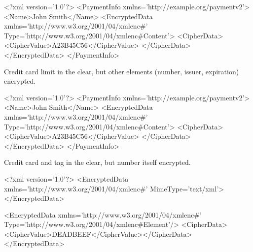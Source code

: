 \documentclass{sepslide-soa-faked} %
\begin{document}
\begin{slide}
\begin{xml}
  <?xml version='1.0'?> 
  <PaymentInfo xmlns='http://example.org/paymentv2'>
    <Name>John Smith</Name>
      <EncryptedData xmlns='http://www.w3.org/2001/04/xmlenc#'
                      Type='http://www.w3.org/2001/04/xmlenc#Content'>
        <CipherData>
          <CipherValue>A23B45C56</CipherValue>
        </CipherData>
      </EncryptedData>
  </PaymentInfo>
\end{xml}
Credit card limit in the clear, but other elements (number, issuer, expiration) encrypted.
\end{slide}

\begin{slide}
\begin{xml}
  <?xml version='1.0'?> 
  <PaymentInfo xmlns='http://example.org/paymentv2'>
    <Name>John Smith</Name>
        <EncryptedData xmlns='http://www.w3.org/2001/04/xmlenc#'
          Type='http://www.w3.org/2001/04/xmlenc#Content'>
          <CipherData>
            <CipherValue>A23B45C56</CipherValue>
          </CipherData>
        </EncryptedData>
  </PaymentInfo>
\end{xml}
Credit card and  tag in the clear, but number itself encrypted.
\end{slide}

\begin{slide}
\begin{xml}
  <?xml version='1.0'?> 
  <EncryptedData xmlns='http://www.w3.org/2001/04/xmlenc#'
   MimeType='text/xml'>
  </EncryptedData>
\end{xml}
\end{slide}

\begin{slide}
\begin{xml}
<EncryptedData xmlns='http://www.w3.org/2001/04/xmlenc#'
        Type='http://www.w3.org/2001/04/xmlenc#Element'/>
   <CipherData><CipherValue>DEADBEEF</CipherValue></CipherData>
</EncryptedData>
\end{xml}
\end{slide}
\end{document}
